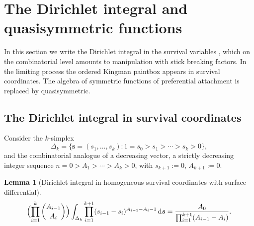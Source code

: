 \documentclass[11pt]{article}
\theoremstyle{plain}
\newtheorem{lemma}[theorem]{Lemma}
\theoremstyle{definition}
\newtheorem{remark}[theorem]{Remark}
\begin{document}
 
 

\section{The Dirichlet integral and quasisymmetric functions }
\label{sec:algebra}
In this section we write the Dirichlet integral in the survival variables \cite{PaisleyBleiJordan2012},
which on the combinatorial level amounts to manipulation with stick breaking factors.
In the limiting process  the ordered Kingman paintbox appears  in survival coordinates. 
The algebra of symmetric functions of preferential attachment is replaced by 
quasisymmetric.


\subsection{The Dirichlet integral in survival coordinates}

\label{sec:DI}
Consider the \(k\)-simplex 
$$\Delta_k=\{\boldsymbol s=(s_1,\ldots,s_k):1=s_0>s_1>\cdots>s_k>0\},$$ 
and the combinatorial analogue of a decreasing vector, a strictly decreasing integer sequence \(n=0>A_1>\cdots>A_k>0\), with \(s_{k+1}:=0\), \(A_{k+1}:=0\).

\begin{lemma}[Dirichlet integral in homogeneous survival coordinates with surface differential]
\label{lem:DI}
\begin{equation}
\label{eq:DI}
\Bigl(\prod_{i=1}^k\binom{A_{i-1}}{A_i}\Bigr)\int_{\Delta_k}\prod_{i=1}^{k+1}(s_{i-1}-s_i)^{A_{i-1}-A_i-1}\,{\rm d}\boldsymbol s
=\frac{A_0}{\prod_{i=1}^{k+1}(A_{i-1}-A_i)}.
\end{equation}
\end{lemma}
\end{document}
